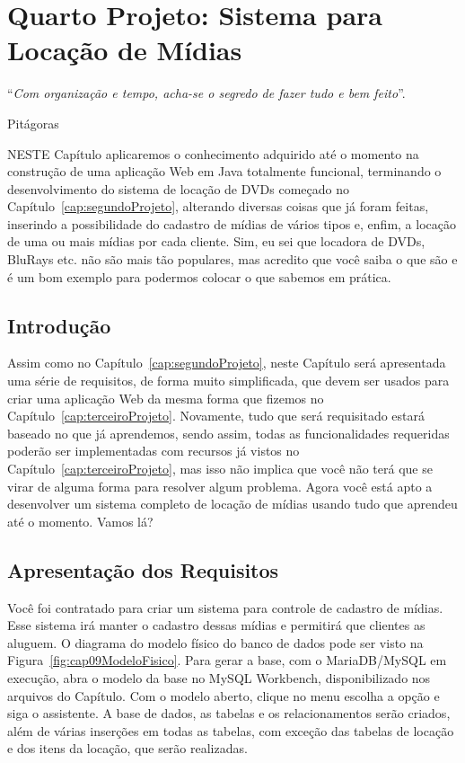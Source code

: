 \chapter{Quarto Projeto: Sistema para Locação de Mídias}\label{cap:quartoProjeto}
\epigraph{``\textit{Com organização e tempo, acha-se o segredo de fazer tudo e bem feito}''.}{Pitágoras}

\lettrine[lines=4, lhang=0.1, lraise=0, loversize=0.2, findent=0.1em]{\textcolor{corAzulTema}{N}}{ESTE} Capítulo aplicaremos o conhecimento adquirido até o momento na construção de uma aplicação Web em Java totalmente funcional, terminando o desenvolvimento do sistema de locação de DVDs começado no Capítulo~\ref{cap:segundoProjeto}, alterando diversas coisas que já foram feitas, inserindo a possibilidade do cadastro de mídias de vários tipos e, enfim, a locação de uma ou mais mídias por cada cliente. Sim, eu sei que locadora de DVDs, BluRays etc. não são mais tão populares, mas acredito que você saiba o que são e é um bom exemplo para podermos colocar o que sabemos em prática.


\section{Introdução}

Assim como no Capítulo~\ref{cap:segundoProjeto}, neste Capítulo será apresentada uma série de requisitos, de forma muito simplificada, que devem ser usados para criar uma aplicação Web da mesma forma que fizemos no Capítulo~\ref{cap:terceiroProjeto}. Novamente, tudo que será requisitado estará baseado no que já aprendemos, sendo assim, todas as funcionalidades requeridas poderão ser implementadas com recursos já vistos no Capítulo~\ref{cap:terceiroProjeto}, mas isso não implica que você não terá que se virar de alguma forma para resolver algum problema. Agora você está apto a desenvolver um sistema completo de locação de mídias usando tudo que aprendeu até o momento. Vamos lá?


\section{Apresentação dos Requisitos}

Você foi contratado para criar um sistema para controle de cadastro de mídias. Esse sistema irá manter o cadastro dessas mídias e permitirá que clientes as aluguem. O diagrama do modelo físico do banco de dados pode ser visto na Figura~\ref{fig:cap09ModeloFisico}. Para gerar a base, com o MariaDB/MySQL em execução, abra o modelo da base no MySQL Workbench, disponibilizado nos arquivos do Capítulo. Com o modelo aberto, clique no menu  escolha a opção  e siga o assistente. A base de dados, as tabelas e os relacionamentos serão criados, além de várias inserções em todas as tabelas, com exceção das tabelas de locação e dos itens da locação, que serão realizadas.

